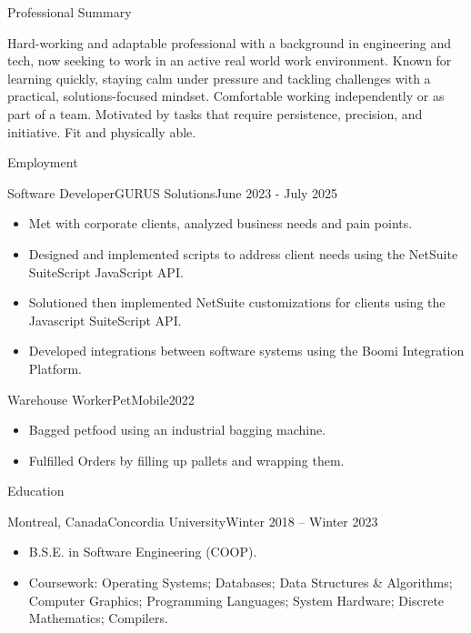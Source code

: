 \documentclass[]{mcdowellcv}
\begin{document}
	\makeheader

	\begin{cvsection}{Professional Summary}
		\begin{cvsubsection}{}{}{}
			Hard-working and adaptable professional with a background in engineering and tech, now seeking to work in an active real world work environment. 
			Known for learning quickly, staying calm under pressure and tackling challenges with a practical, solutions-focused mindset.
			Comfortable working independently or as part of a team. Motivated by tasks that require persistence, precision, and initiative. Fit and physically able.
		\end{cvsubsection}
	\end{cvsection}

	\begin{cvsection}{Employment}
		\begin{cvsubsection}{Software Developer}{GURUS Solutions}{June 2023 - July 2025}
			\begin{itemize}
				\item Met with corporate clients, analyzed business needs and pain points.
				\item Designed and implemented scripts to address client needs using the NetSuite SuiteScript JavaScript API.
                \item Solutioned then implemented NetSuite customizations for clients using the Javascript SuiteScript API.
                \item Developed integrations between software systems using the Boomi Integration Platform.
			\end{itemize}
		\end{cvsubsection}

		\begin{cvsubsection}{Warehouse Worker}{PetMobile}{2022}
			\begin{itemize}
				\item Bagged petfood using an industrial bagging machine.
				\item Fulfilled Orders by filling up pallets and wrapping them. 
			\end{itemize}
		\end{cvsubsection}

	\end{cvsection}
	
	\begin{cvsection}{Education}
		\begin{cvsubsection}{Montreal, Canada}{Concordia University}{Winter 2018 -- Winter 2023}
			\begin{itemize}
				\item B.S.E. in Software Engineering (COOP).
                \item Coursework: Operating Systems; Databases; Data Structures \& Algorithms; Computer Graphics; Programming Languages; System Hardware; Discrete Mathematics; Compilers.
			\end{itemize}
		\end{cvsubsection}
	\end{cvsection}
\end{document}
